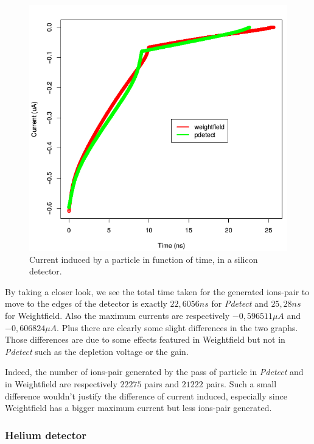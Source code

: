 \documentclass[11pt]{article}
\begin{document}
				\begin{figure}[H]
				  \center
				  \includegraphics[scale=0.5]{images/applications/silicon_current.png}
				  \caption{Current induced by a particle in function of time, in a silicon detector.}
				  \label{fig:silicon}
				\end{figure}

				By taking a closer look, we see the total time taken for the generated ions-pair to move to the edges of the
				detector is exactly $22,6056ns$ for \textit{Pdetect} and $25,28ns$ for Weightfield. Also the maximum
				currents are respectively $-0,596511\mu A$ and $-0,606824\mu A$. Plus there are clearly some slight
				differences in the two graphs. Those differences are due to some effects featured in Weightfield
				but not in \textit{Pdetect} such as the depletion voltage or the gain.

				Indeed, the number of ions-pair generated by the pass of particle in \textit{Pdetect} and in Weightfield
				are respectively $22275$ pairs and $21222$ pairs. Such a small difference wouldn't justify the difference
				of current induced, especially since Weightfield has a bigger maximum current but less ions-pair generated.

		\subsubsection{Helium detector}
\end{document}
